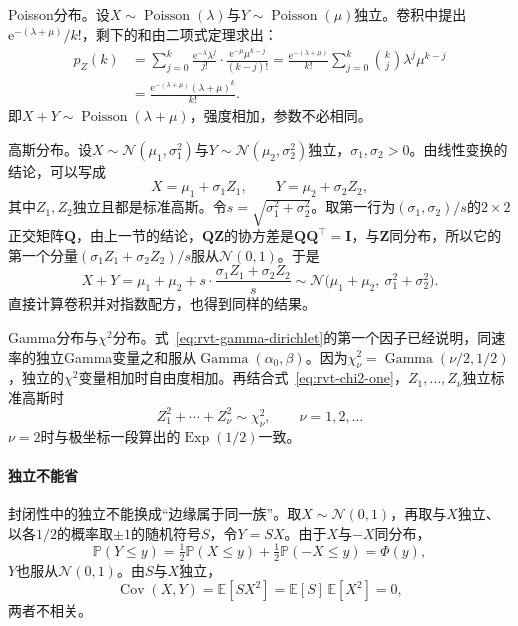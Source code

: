 Poisson分布。设$X\sim\operatorname{Poisson}(\lambda)$与$Y\sim\operatorname{Poisson}(\mu)$独立。卷积中提出$\mathrm{e}^{-(\lambda+\mu)}/k!$，剩下的和由二项式定理求出：
\[
 \begin{aligned}
 p_Z(k)&=\sum_{j=0}^{k}\frac{\mathrm{e}^{-\lambda}\lambda^{j}}{j!}\cdot\frac{\mathrm{e}^{-\mu}\mu^{k-j}}{(k-j)!}
 =\frac{\mathrm{e}^{-(\lambda+\mu)}}{k!}\sum_{j=0}^{k}\binom{k}{j}\lambda^{j}\mu^{k-j}\\
 &=\frac{\mathrm{e}^{-(\lambda+\mu)}(\lambda+\mu)^{k}}{k!} .
 \end{aligned}
\]
即$X+Y\sim\operatorname{Poisson}(\lambda+\mu)$，强度相加，参数不必相同。

高斯分布。设$X\sim\mathcal{N}(\mu_1,\sigma_1^2)$与$Y\sim\mathcal{N}(\mu_2,\sigma_2^2)$独立，$\sigma_1,\sigma_2>0$。由线性变换的结论，可以写成
\[
 X=\mu_1+\sigma_1Z_1,\qquad Y=\mu_2+\sigma_2Z_2 ,
\]
其中$Z_1,Z_2$独立且都是标准高斯。令$s=\sqrt{\sigma_1^2+\sigma_2^2}$。取第一行为$(\sigma_1,\sigma_2)/s$的$2\times2$正交矩阵$\bm{Q}$，由上一节的结论，$\bm{Q}\bm{Z}$的协方差是$\bm{Q}\bm{Q}^{\top}=\bm{I}$，与$\bm{Z}$同分布，所以它的第一个分量$(\sigma_1Z_1+\sigma_2Z_2)/s$服从$\mathcal{N}(0,1)$。于是
\begin{equation}
 X+Y=\mu_1+\mu_2+s\cdot\frac{\sigma_1Z_1+\sigma_2Z_2}{s}\sim\mathcal{N}\bigl(\mu_1+\mu_2,\ \sigma_1^2+\sigma_2^2\bigr) .
 \label{eq:rvt-gaussian-sum}
\end{equation}
直接计算卷积并对指数配方，也得到同样的结果。

Gamma分布与$\chi^2$分布。式~\eqref{eq:rvt-gamma-dirichlet}的第一个因子已经说明，同速率的独立Gamma变量之和服从$\operatorname{Gamma}(\alpha_0,\beta)$。因为$\chi^2_\nu=\operatorname{Gamma}(\nu/2,1/2)$，独立的$\chi^2$变量相加时自由度相加。再结合式~\eqref{eq:rvt-chi2-one}，$Z_1,\ldots,Z_\nu$独立标准高斯时
\begin{equation}
 Z_1^2+\cdots+Z_\nu^2\sim\chi^2_\nu,\qquad \nu=1,2,\ldots
 \label{eq:rvt-chi2-sum}
\end{equation}
$\nu=2$时与极坐标一段算出的$\operatorname{Exp}(1/2)$一致。

\paragraph{独立不能省}
封闭性中的独立不能换成“边缘属于同一族”。取$X\sim\mathcal{N}(0,1)$，再取与$X$独立、以各$1/2$的概率取$\pm1$的随机符号$S$，令$Y=SX$。由于$X$与$-X$同分布，
\[
 \mathbb{P}(Y\leq y)=\tfrac12\mathbb{P}(X\leq y)+\tfrac12\mathbb{P}(-X\leq y)=\Phi(y),
\]
$Y$也服从$\mathcal{N}(0,1)$。由$S$与$X$独立，
\[
 \operatorname{Cov}(X,Y)=\mathbb{E}[SX^2]=\mathbb{E}[S]\,\mathbb{E}[X^2]=0 ,
\]
两者不相关。

